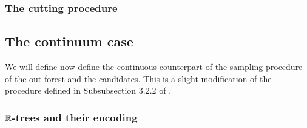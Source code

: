 \subsubsection{The cutting procedure}
\subsection{The continuum case}
We will define now define the continuous counterpart of the sampling procedure of the out-forest and the candidates. This is a slight modification of the procedure defined in Subsubsection 3.2.2 of \cite{Goldschmidt2019}. \\
\subsubsection{${\mathbb R}$-trees and their encoding}
